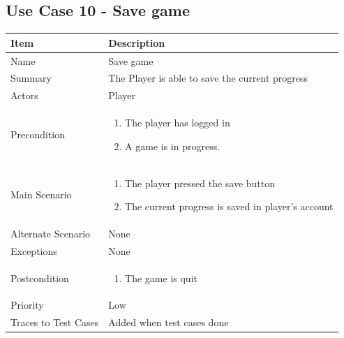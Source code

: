 \documentclass[12pt]{article}
\begin{document}
\newpage


\subsection{Use Case 10 - Save game}

\begin{center}
\setlength{\tabcolsep}{18pt}
\renewcommand{\arraystretch}{1.3}
\begin{tabular}{ |p{3.4cm}|p{10cm}| }
    \hline
    \textbf{Item} & \textbf{Description}\\
    \hline
    Name & Save game \\
    \hline
    Summary & The Player is able to save the current progress \\
    \hline
    Actors & Player \\
    \hline
    Precondition & 
    \vspace*{-0.1in}
    \begin{enumerate}[leftmargin=0.2in]
        \item The player has logged in
        \item A game is in progress.
        
    \end{enumerate}  \\
    \hline
    Main Scenario &     
    \vspace*{-0.1in}
    \begin{enumerate}[leftmargin=0.2in]
        \item The player pressed the save button
        \item The current progress is saved in player's account
    \end{enumerate}  \\
    \hline
    Alternate Scenario & None \\
    \hline
    Exceptions & None  \\
    \hline
    Postcondition &
    \vspace*{-0.1in}
    \begin{enumerate}[leftmargin=0.2in]
        \item The game is quit
    \end{enumerate}  \\
    \hline
    Priority & Low \\
    \hline
    \small{Traces to Test Cases} & Added when test cases done  \\
    \hline
\end{tabular}
\end{center}
\end{document}
